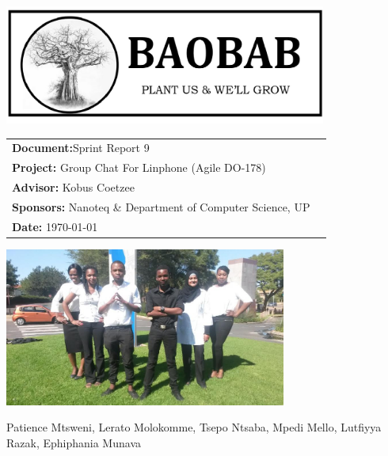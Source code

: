 \begin{titlepage}

\begin{center}

\includegraphics[width=400px]{pictures/logo.jpg}
\vspace{0.5 cm}
\begin{flushright} \large
\begin{tabular}{lr}
\vspace{1 cm}
\LARGE\textbf{Document:}Sprint Report 9\\

\vspace{1 cm}
\LARGE\textbf{Project:} Group Chat For Linphone (Agile DO-178)\\
\vspace{1 cm}
\LARGE\textbf{Advisor:} Kobus Coetzee\\
\vspace{1 cm}
\LARGE\textbf{Sponsors:} Nanoteq \& Department of Computer Science, UP\\
\vspace{1 cm}
\LARGE\textbf{Date: }\today\\
\end{tabular}
\end{flushright}

\centering \includegraphics[width=350px]{pictures/Team.jpg}

Patience Mtsweni, Lerato Molokomme, Tsepo Ntsaba, Mpedi Mello, Lutfiyya Razak, Ephiphania Munava\\


\end{center}
\end{titlepage}